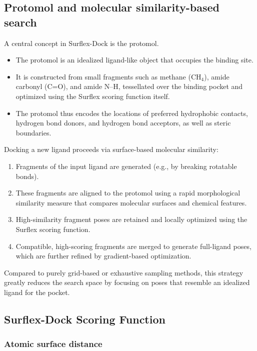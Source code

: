 \documentclass[12pt, a4paper]{article}
\begin{document}
\subsection{Protomol and molecular similarity-based search}

A central concept in Surflex-Dock is the protomol.\cite{CH7_Jain2003Surflex}
\begin{itemize}
  \item The protomol is an idealized ligand-like object that occupies the binding site.
  \item It is constructed from small fragments such as methane (CH\(_4\)), amide carbonyl (C=O), and amide N--H, tessellated over the binding pocket and optimized using the Surflex scoring function itself.
  \item The protomol thus encodes the locations of preferred hydrophobic contacts, hydrogen bond donors, and hydrogen bond acceptors, as well as steric boundaries.
\end{itemize}

Docking a new ligand proceeds via surface-based molecular similarity:
\begin{enumerate}
  \item Fragments of the input ligand are generated (e.g., by breaking rotatable bonds).
  \item These fragments are aligned to the protomol using a rapid morphological similarity measure that compares molecular surfaces and chemical features.
  \item High-similarity fragment poses are retained and locally optimized using the Surflex scoring function.
  \item Compatible, high-scoring fragments are merged to generate full-ligand poses, which are further refined by gradient-based optimization.
\end{enumerate}

Compared to purely grid-based or exhaustive sampling methods, this strategy greatly reduces the search space by focusing on poses that resemble an idealized ligand for the pocket.

\subsection{Surflex-Dock Scoring Function}

\subsubsection{Atomic surface distance}
\end{document}

